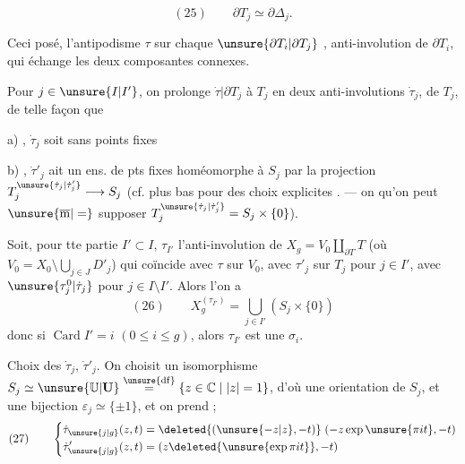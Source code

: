 \[
(25)\qquad \partial T_j\simeq\partial\Delta_j.
\]



Ceci posé, l'antipodisme $\tau$  sur chaque $\unsure{\partial T_i|\partial T_j}$ , anti-involution     de $\partial T_i$, qui échange les deux composantes connexes.

Pour  $j\in\unsure{I|I'}$, on prolonge $\dot\tau|\partial T_j$ à $T_j$ en deux anti-involutions $\dot\tau_j$,  de $T_j$,   de telle façon que

a) , $\dot\tau_j$ soit sans points fixes

b) , $\dot\tau'_j$ ait un ens. de pts fixes homéomorphe à $S_j$ par la projection $T_j^{\unsure{\dot\tau_j|\dot\tau'_j}}\longrightarrow S_j$ (cf. plus bas \unsure{\}} pour des choix   explicites \unsure{\}}. --- on  qu'on peut $\unsure{\overline{\mathrm m}|=}$ supposer $T_j^{\unsure{\dot\tau_j|\dot\tau'_j}}=S_j\times\{0\}$).

Soit, pour tte partie $I'\subset I$, $\tau_{I'}$ l'anti-involution de $X_g=V_0\amalg_{\partial T}T$ (où $V_0=X_0\setminus\bigcup_{j\in J}D'_j$) qui coïncide avec $\tau$ sur $V_0$, avec $\tau'_j$ sur $T_j$ pour $j\in I'$, avec $\unsure{\tau_j^0|\dot\tau_j}$ pour $j\in I\setminus I'$. Alors l'on a
\[
(26)\qquad X_g^{(\tau_{I'})}=\bigcup_{j\in I'}(S_j\times\{0\})
\]
donc si $\operatorname{Card}I'=i$ $(0\leq i\leq g)$, alors $\tau_{I'}$ est une $\sigma_i$.

Choix des $\dot\tau_j$, $\dot\tau'_j$. On choisit un isomorphisme $S_j\simeq\unsure{\mathbb U|\mathbf U}\overset{\unsure{\mathrm{df}}}{=}\{z\in\mathbb C\mid |z|=1\}$, d'où une orientation de $S_j$, et une bijection $\varepsilon_j\simeq\{\pm1\}$,  et on prend ;
\[
(27)\qquad
\left\{\begin{aligned}
\dot\tau_{\unsure{j|g}}(z,t)&=\deleted{(\unsure{-z|z},-t)}\;(-z\exp\unsure{\pi it},-t)\\
\dot\tau'_{\unsure{j|g}}(z,t)&=(z\deleted{\unsure{\exp\pi it}},-t)
\end{aligned}\right.
\]

